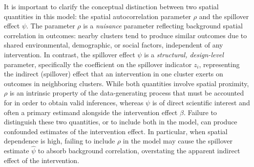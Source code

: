 \documentclass{article}[11pt]
\begin{document}
It is important to clarify the conceptual distinction between two spatial quantities in this model: the spatial autocorrelation parameter $\rho$ and the spillover effect $\psi$. The parameter $\rho$ is a \emph{nuisance} parameter reflecting background spatial correlation in outcomes: nearby clusters tend to produce similar outcomes due to shared environmental, demographic, or social factors, independent of any intervention. In contrast, the spillover effect $\psi$ is a \emph{structural, design-level} parameter, specifically the coefficient on the spillover indicator $z_i$, representing the indirect (spillover) effect that an intervention in one cluster exerts on outcomes in neighboring clusters. While both quantities involve spatial proximity, $\rho$ is an intrinsic property of the data-generating process that must be accounted for in order to obtain valid inferences, whereas $\psi$ is of direct scientific interest and often a primary estimand alongside the intervention effect $\beta$. Failure to distinguish these two quantities, or to include both in the model, can produce confounded estimates of the intervention effect. In particular, when spatial dependence is high, failing to include $\rho$ in the model may cause the spillover estimate $\hat{\psi}$ to absorb background correlation, overstating the apparent indirect effect of the intervention.
\end{document}
